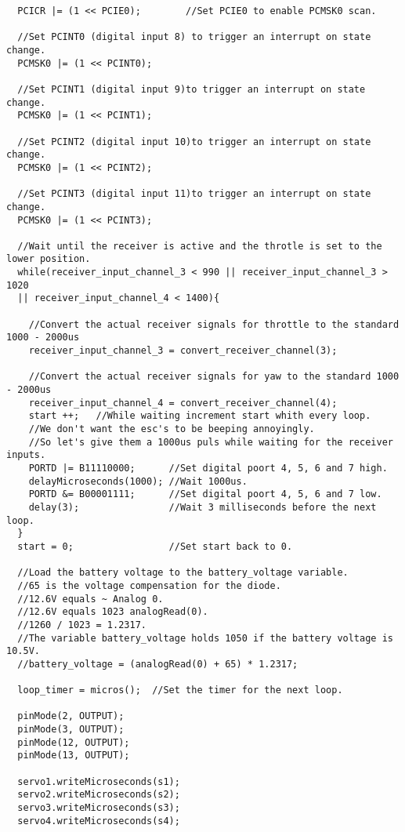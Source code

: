 \begin{lstlisting}
  PCICR |= (1 << PCIE0);        //Set PCIE0 to enable PCMSK0 scan.

  //Set PCINT0 (digital input 8) to trigger an interrupt on state change.
  PCMSK0 |= (1 << PCINT0);

  //Set PCINT1 (digital input 9)to trigger an interrupt on state change.
  PCMSK0 |= (1 << PCINT1);
  
  //Set PCINT2 (digital input 10)to trigger an interrupt on state change.                                                 
  PCMSK0 |= (1 << PCINT2); 

  //Set PCINT3 (digital input 11)to trigger an interrupt on state change.
  PCMSK0 |= (1 << PCINT3);                                                  

  //Wait until the receiver is active and the throtle is set to the lower position.
  while(receiver_input_channel_3 < 990 || receiver_input_channel_3 > 1020 
  || receiver_input_channel_4 < 1400){
    
    //Convert the actual receiver signals for throttle to the standard 1000 - 2000us
    receiver_input_channel_3 = convert_receiver_channel(3);
    
    //Convert the actual receiver signals for yaw to the standard 1000 - 2000us                 
    receiver_input_channel_4 = convert_receiver_channel(4);                 
    start ++;   //While waiting increment start whith every loop.
    //We don't want the esc's to be beeping annoyingly. 
    //So let's give them a 1000us puls while waiting for the receiver inputs.
    PORTD |= B11110000;      //Set digital poort 4, 5, 6 and 7 high.
    delayMicroseconds(1000); //Wait 1000us.
    PORTD &= B00001111;      //Set digital poort 4, 5, 6 and 7 low.
    delay(3);                //Wait 3 milliseconds before the next loop.
  }
  start = 0;                 //Set start back to 0.

  //Load the battery voltage to the battery_voltage variable.
  //65 is the voltage compensation for the diode.
  //12.6V equals ~ Analog 0.
  //12.6V equals 1023 analogRead(0).
  //1260 / 1023 = 1.2317.
  //The variable battery_voltage holds 1050 if the battery voltage is 10.5V.
  //battery_voltage = (analogRead(0) + 65) * 1.2317;

  loop_timer = micros();  //Set the timer for the next loop.

  pinMode(2, OUTPUT);
  pinMode(3, OUTPUT);
  pinMode(12, OUTPUT);
  pinMode(13, OUTPUT);

  servo1.writeMicroseconds(s1);
  servo2.writeMicroseconds(s2);
  servo3.writeMicroseconds(s3);
  servo4.writeMicroseconds(s4);
 

\end{lstlisting}
